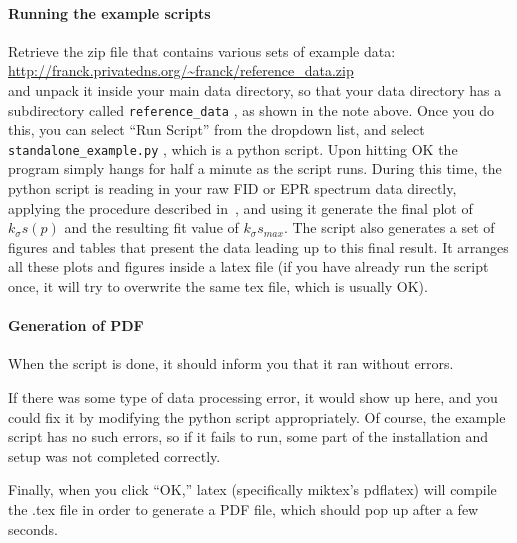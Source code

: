 \paragraph{Running the example scripts}
Retrieve the zip file
    that contains various sets of example data:\\ 
    \url{http://franck.privatedns.org/~franck/reference_data.zip}\\ 
and unpack it inside your main data directory,
    so that your data directory has a subdirectory called
    \texttt{reference\_data} , as shown in the note above.
Once you do this, you can select ``Run Script'' from the dropdown
    list,
    and select \texttt{standalone\_example.py} ,
    which is a python script.
Upon hitting OK the program simply hangs for
    half a minute
    as the script runs.
During this time,
    the python script is reading in your raw FID or
    EPR spectrum data directly,
    applying the procedure described in~\cite{FranckPNMRS},
    and using it generate the final plot of $k_\sigma s(p)$
    and the resulting fit value of $k_\sigma s_{max}$.
The script also generates a set of figures and tables
    that present the data leading up to this final result.
It arranges all these plots and figures inside a latex file
    (if you have already run the script once, it will try to
    overwrite the same tex file, which is usually OK).
\paragraph{Generation of PDF}
When the script is done, it should inform you that it ran without
    errors.
\begin{inplacenotebox}
    If there was some type of data processing error,
        it would show up here, and you could fix it  by modifying the
        python script appropriately.
    Of course, the example script has no such errors,
        so if it fails to run,
        some part of the installation and setup was not completed correctly.
\end{inplacenotebox}
Finally, when you click ``OK,'' latex (specifically miktex's pdflatex)
    will compile the .tex file in order to generate a PDF file,
    which should pop up after a few seconds.
